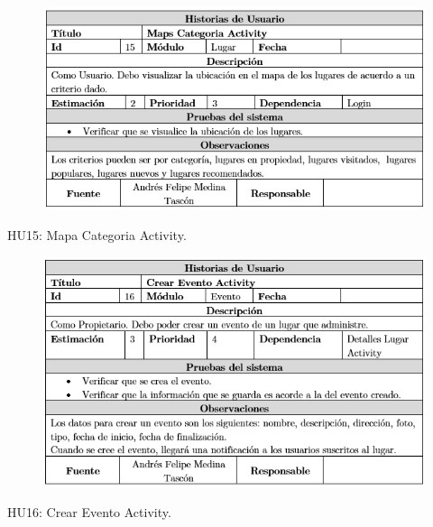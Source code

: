 \documentclass[12pt,letterpaper,openany]{book}
\begin{document}
\begin{table}[H]
\begin{center}
\begin{figure}[H]
\begin{center}
\includegraphics[width=13cm]{./imagenes/HU/HU15}
\end{center}
\end{figure}
\end{center}
\caption{HU15: Mapa Categoria Activity.}
\end{table}

\begin{table}[H]
\begin{center}
\begin{figure}[H]
\begin{center}
\includegraphics[width=13cm]{./imagenes/HU/HU16}
\end{center}
\end{figure}
\end{center}
\caption{HU16: Crear Evento Activity.}
\end{table}
\end{document}
